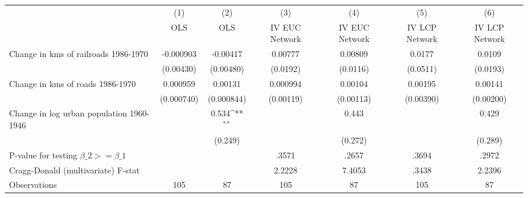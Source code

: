 {
\def\sym#1{\ifmmode^{#1}\else\(^{#1}\)\fi}
\begin{tabular}{l*{6}{c}}
\hline\hline
                &\multicolumn{1}{c}{(1)}&\multicolumn{1}{c}{(2)}&\multicolumn{1}{c}{(3)}&\multicolumn{1}{c}{(4)}&\multicolumn{1}{c}{(5)}&\multicolumn{1}{c}{(6)}\\
                &\multicolumn{1}{c}{OLS}&\multicolumn{1}{c}{OLS}&\multicolumn{1}{c}{IV EUC Network}&\multicolumn{1}{c}{IV EUC Network}&\multicolumn{1}{c}{IV LCP Network}&\multicolumn{1}{c}{IV LCP Network}\\
\hline
Change in kms of railroads 1986-1970&-0.000903         & -0.00417         &  0.00777         &  0.00809         &   0.0177         &   0.0109         \\
                &(0.00430)         &(0.00480)         & (0.0192)         & (0.0116)         & (0.0511)         & (0.0193)         \\
[1em]
Change in kms of roads 1986-1970& 0.000959         &  0.00131         & 0.000994         &  0.00104         &  0.00195         &  0.00141         \\
                &(0.000740)         &(0.000844)         &(0.00119)         &(0.00113)         &(0.00390)         &(0.00200)         \\
[1em]
Change in log urban population 1960-1946&                  &    0.534\sym{**} &                  &    0.443         &                  &    0.429         \\
                &                  &  (0.249)         &                  &  (0.272)         &                  &  (0.289)         \\
\hline
P-value for testing $\beta\_{2} >= \beta\_{1}$&                  &                  &    .3571         &    .2657         &    .3694         &    .2972         \\
Cragg-Donald (multivariate) F-stat&                  &                  &   2.2228         &   7.4053         &    .3438         &   2.2396         \\
Observations    &      105         &       87         &      105         &       87         &      105         &       87         \\
\hline\hline
\end{tabular}
}
